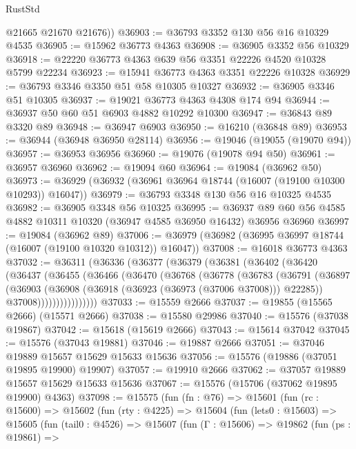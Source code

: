 \begin{lexlean}{RustStd}
\begin{coremodule}
        @21665
        @21670
        @21676))
@36903 := @36793 @3352 @130 @56 @16 @10329 @4535
@36905 := @15962 @36773 @4363
@36908 := @36905 @3352 @56 @10329
@36918 := @22220 @36773 @4363 @639 @56 @3351 @22226 @4520 @10328 @5799 @22234
@36923 := @15941 @36773 @4363 @3351 @22226 @10328
@36929 := @36793 @3346 @3350 @51 @58 @10305 @10327
@36932 := @36905 @3346 @51 @10305
@36937 := @19021 @36773 @4363 @4308 @174 @94
@36944 := @36937 @50 @60 @51 @6903 @4882 @10292 @10300
@36947 := @36843 @89 @3320 @89
@36948 := @36947 @6903
@36950 := @16210 (@36848 @89)
@36953 := @36944 (@36948 @36950 @28114)
@36956 := @19046 (@19055 (@19070 @94))
@36957 := @36953 @36956
@36960 := @19076 (@19078 @94 @50)
@36961 := @36957 @36960
@36962 := @19094 @60
@36964 := @19084 (@36962 @50)
@36973 := @36929 (@36932 (@36961 @36964 @18744 (@16007 (@19100 @10300 @10293)) @16047))
@36979 := @36793 @3348 @130 @56 @16 @10325 @4535
@36982 := @36905 @3348 @56 @10325
@36995 := @36937 @89 @60 @56 @4585 @4882 @10311 @10320 (@36947 @4585 @36950 @16432) @36956 @36960
@36997 := @19084 (@36962 @89)
@37006 := @36979 (@36982 (@36995 @36997 @18744 (@16007 (@19100 @10320 @10312)) @16047))
@37008 := @16018 @36773 @4363
@37032 := @36311
    (@36336
      (@36377
        (@36379
          (@36381
            (@36402
              (@36420
                (@36437
                  (@36455
                    (@36466
                      (@36470
                        (@36768
                          (@36778
                            (@36783
                              (@36791
                                (@36897
                                  (@36903
                                    (@36908 (@36918 (@36923 (@36973 (@37006 @37008))) @22285))
                                    @37008))))))))))))))))
@37033 := @15559 @2666
@37037 := @19855 (@15565 @2666) (@15571 @2666)
@37038 := @15580 @29986
@37040 := @15576 (@37038 @19867)
@37042 := @15618 (@15619 @2666)
@37043 := @15614 @37042
@37045 := @15576 (@37043 @19881)
@37046 := @19887 @2666
@37051 := @37046 @19889 @15657 @15629 @15633 @15636
@37056 := @15576 (@19886 (@37051 @19895 @19900) @19907)
@37057 := @19910 @2666
@37062 := @37057 @19889 @15657 @15629 @15633 @15636
@37067 := @15576 (@15706 (@37062 @19895 @19900) @4363)
@37098 := @15575
    (fun (fn : @76) =>
    @15601
      (fun (rc : @15600) =>
      @15602
        (fun (rty : @4225) =>
        @15604
          (fun (lets0 : @15603) =>
          @15605
            (fun (tail0 : @4526) =>
            @15607
              (fun (Γ : @15606) =>
              @19862
                (fun (ps : @19861) =>

\end{coremodule}
\end{lexlean}
